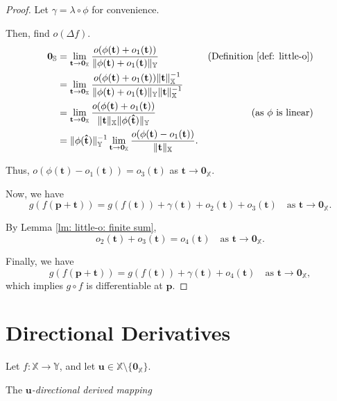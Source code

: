 \begin{lemma}
\begin{proof}
		Let $\gamma = \lambda \circ \phi$ for convenience.
		
		Then, find $o(\Delta f)$.
		$$
		\begin{aligned}
			\mathbf 0_{\mathbb S} &= \lim_{\mathbf t \to \mathbf 0_{\mathbb X}} \frac{o(\phi(\mathbf t) + o_1(\mathbf t))}{\| \phi(\mathbf t) + o_1(\mathbf t) \|_{\mathbb Y}}
			&\text{(Definition \ref{def: little-o})} \\
			&= \lim_{\mathbf t \to \mathbf 0_{\mathbb X}} \frac{ o(\phi(\mathbf t) + o_1(\mathbf t)) \| \mathbf t \|_{\mathbb X}^{-1} }{ \| \phi(\mathbf t) + o_1(\mathbf t) \|_{\mathbb Y} \| \mathbf t \|_{\mathbb X}^{-1} } \\
			&= \lim_{\mathbf t \to \mathbf 0_{\mathbb X}} \frac{o(\phi(\mathbf t) + o_1(\mathbf t))}{\| \mathbf t \|_{\mathbb X} \| \phi(\mathbf{\hat t})\| _{\mathbb Y}}
			&\text{(as $\phi$ is linear)} \\
			&= \| \phi(\mathbf{\hat t}) \|_{\mathbb Y}^{-1} \lim_{\mathbf t \to \mathbf 0_{\mathbb X}} \frac{o(\phi(\mathbf t) - o_1(\mathbf t))}{\| \mathbf t \|_{\mathbb X}}.
		\end{aligned}
		$$
		
		Thus, $o(\phi(\mathbf t) - o_1(\mathbf t)) = o_3(\mathbf t)$ as $\mathbf t \to \mathbf 0_{\mathbb X}$.
		
		Now, we have
		$$
		g(f(\mathbf p + \mathbf t)) = g(f(\mathbf t)) + \gamma(\mathbf t) + o_2(\mathbf t) + o_3(\mathbf t) \quad \text{as $\mathbf t \to \mathbf 0_{\mathbb X}$}.
		$$
		
		By Lemma \ref{lm: little-o: finite sum},
		$$
		o_2(\mathbf t) + o_3(\mathbf t) = o_4(\mathbf t) \quad \text{as $\mathbf t \to \mathbf 0_{\mathbb X}$}.
		$$
		
		Finally, we have
		$$
		g(f(\mathbf p + \mathbf t)) = g(f(\mathbf t)) + \gamma(\mathbf t) + o_4(\mathbf t) \quad \text{as $\mathbf t \to \mathbf 0_{\mathbb X}$},
		$$
		which implies $g \circ f$ is differentiable at $\mathbf p$.
	\end{proof}
\end{lemma}


\section{Directional Derivatives}


\begin{definition}
	\label{def: directional derivatives}
	
	Let $f: \mathbb X \to \mathbb Y$, and let $\mathbf u \in \mathbb X \setminus \{ \mathbf 0_{\mathbb X} \}$.
	
	The \textit{$\mathbf u$-directional derived mapping}
\end{definition}




